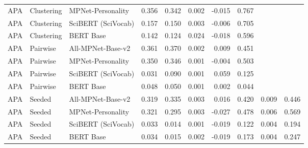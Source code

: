 \begin{table}[ht]
\begin{tabular}{lllrrrrrrr}
APA & Clustering & MPNet-Personality & 0.356 & 0.342 & 0.002 & -0.015 & 0.767 &  &  \\
APA & Clustering & SciBERT (SciVocab) & 0.157 & 0.150 & 0.003 & -0.006 & 0.705 &  &  \\
APA & Clustering & BERT Base & 0.142 & 0.124 & 0.024 & -0.018 & 0.596 &  &  \\
APA & Pairwise & All-MPNet-Base-v2 & 0.361 & 0.370 & 0.002 & 0.009 & 0.451 &  &  \\
APA & Pairwise & MPNet-Personality & 0.350 & 0.346 & 0.001 & -0.004 & 0.503 &  &  \\
APA & Pairwise & SciBERT (SciVocab) & 0.031 & 0.090 & 0.001 & 0.059 & 0.125 &  &  \\
APA & Pairwise & BERT Base & 0.048 & 0.050 & 0.001 & 0.002 & 0.044 &  &  \\
APA & Seeded & All-MPNet-Base-v2 & 0.319 & 0.335 & 0.003 & 0.016 & 0.420 & 0.009 & 0.446 \\
APA & Seeded & MPNet-Personality & 0.321 & 0.295 & 0.003 & -0.027 & 0.478 & 0.006 & 0.569 \\
APA & Seeded & SciBERT (SciVocab) & 0.033 & 0.014 & 0.001 & -0.019 & 0.122 & 0.004 & 0.194 \\
APA & Seeded & BERT Base & 0.034 & 0.015 & 0.002 & -0.019 & 0.173 & 0.004 & 0.247 \\
\bottomrule
\end{tabular}
\end{table}
